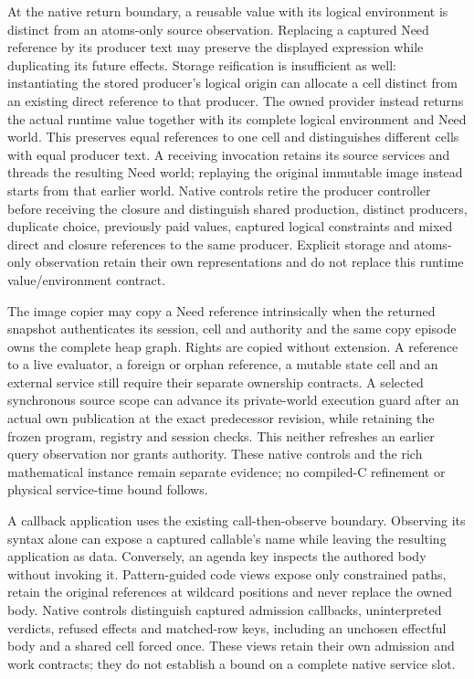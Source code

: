 \documentclass[11pt]{article}
\theoremstyle{definition}
\theoremstyle{remark}
\begin{document}
At the native return boundary, a reusable value with its logical environment
is distinct from an atoms-only source observation. Replacing a captured Need
reference by its producer text may preserve the displayed expression while
duplicating its future effects. Storage reification is insufficient as well:
instantiating the stored producer's logical origin can allocate a cell distinct
from an existing direct reference to that producer. The owned provider instead
returns the actual runtime value together with its complete logical environment
and Need world. This preserves equal references to one cell and distinguishes
different cells with equal producer text. A receiving
invocation retains its source services and threads the resulting Need world;
replaying the original immutable image instead starts from that earlier
world. Native controls retire the producer controller before receiving the
closure and distinguish shared production, distinct producers, duplicate
choice, previously paid values, captured logical constraints and mixed direct
and closure references to the same producer. Explicit storage and atoms-only
observation retain their own representations and do not replace this runtime
value/environment contract.

The image copier may copy a Need reference intrinsically when the returned
snapshot authenticates its session, cell and authority and the same copy
episode owns the complete heap graph. Rights are copied without extension.
A reference to a live evaluator, a foreign or orphan reference, a mutable
state cell and an external service still require their separate ownership
contracts. A selected synchronous source scope can advance its private-world
execution guard after an actual own publication at the exact predecessor
revision, while retaining the frozen program, registry and session checks.
This neither refreshes an earlier query observation nor grants authority.
These native controls and the rich mathematical instance remain separate
evidence; no compiled-C refinement or physical service-time bound follows.

A callback application uses the existing call-then-observe boundary.
Observing its syntax alone can expose a captured callable's name while
leaving the resulting application as data. Conversely, an agenda key
inspects the authored body without invoking it. Pattern-guided code views
expose only constrained paths, retain the original references at wildcard
positions and never replace the owned body. Native controls distinguish
captured admission callbacks, uninterpreted verdicts, refused effects and
matched-row keys, including an unchosen effectful body and a shared cell
forced once. These views retain their own admission and work contracts;
they do not establish a bound on a complete native service slot.
\end{document}
